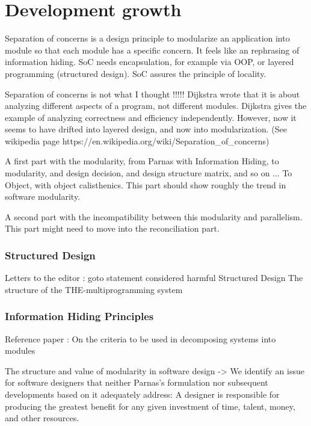 \section{Development growth}

Separation of concerns is a design principle to modularize an application into module so that each module has a specific concern.
It feels like an rephrasing of information hiding.
SoC needs encapsulation, for example via OOP, or layered programming (structured design).
SoC assures the principle of locality.

Separation of concerns is not what I thought !!!!!
Dijkstra \cite{Dijkstra1982} wrote that it is about analyzing different aspects of a program, not different modules.
Dijkstra gives the example of analyzing correctness and efficiency independently.
However, now it seems to have drifted into layered design, and now into modularization.
(See wikipedia page https://en.wikipedia.org/wiki/Separation_of_concerns)


A first part with the modularity, from Parnas with Information Hiding, to modularity, and design decision, and design structure matrix, and so on ...
To Object, with object calisthenics.
This part should show roughly the trend in software modularity.

A second part with the incompatibility between this modularity and parallelism.
This part might need to move into the reconciliation part.


\subsubsection{Structured Design}

Letters to the editor : goto statement considered harmful \cite{Dijkstra1968a}
Structured Design \cite{Stevens1974}
The structure of the THE-multiprogramming system \cite{Dijkstra1968}



\subsubsection{Information Hiding Principles}

Reference paper :
On the criteria to be used in decomposing systems into modules \cite{Parnas1972}


The structure and value of modularity in software design \cite{Sullivan2001a}
-> We identify an issue for software designers that neither Parnas’s formulation nor subsequent developments based on it adequately address: A designer is responsible for producing the greatest benefit for any given investment of time, talent, money, and other resources.


